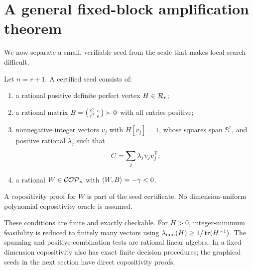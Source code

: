 \section{A general fixed-block amplification theorem}
We now separate a small, verifiable seed from the scale that makes local search difficult.

\begin{definition}\label{def:seed}
Let $n=r+1$. A certified seed consists of:
\begin{enumerate}
\item a rational positive definite perfect vertex $H\in\mathcal R_r$;
\item a rational matrix $B=\left(\begin{smallmatrix}C&c\\c^{\mathsf T}&a\end{smallmatrix}\right)\succ0$ with all entries positive;
\item nonnegative integer vectors $v_j$ with $H[v_j]=1$, whose squares span $\mathbb S^r$, and positive rational $\lambda_j$ such that
\begin{equation}\label{eq:reserve} C=\sum_j\lambda_jv_jv_j^{\mathsf T};\end{equation}
\item a rational $W\in\mathcal{COP}_n$ with $\langle W,B\rangle=-\gamma<0$.
\end{enumerate}
A copositivity proof for $W$ is part of the seed certificate. No dimension-uniform polynomial copositivity oracle is assumed.
\end{definition}

These conditions are finite and exactly checkable. For $H>0$, integer-minimum feasibility is reduced to finitely many vectors using $\lambda_{\min}(H)\ge1/\operatorname{tr}(H^{-1})$. The spanning and positive-combination tests are rational linear algebra. In a fixed dimension copositivity also has exact finite decision procedures; the graphical seeds in the next section have direct copositivity proofs.

